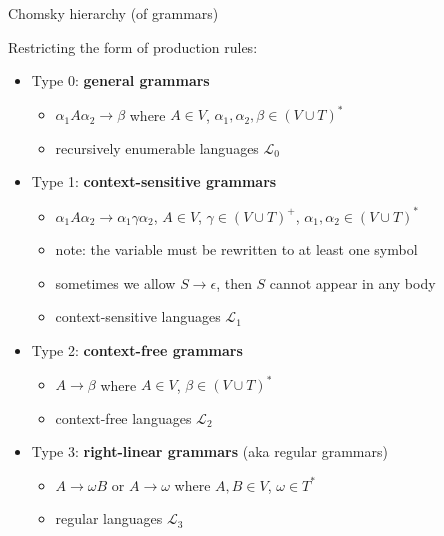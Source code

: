 \documentclass[handout]{beamer}
\begin{document}
\begin{frame}{Chomsky hierarchy (of grammars)}

	Restricting the form of production rules:

	\begin{itemize}
		\item Type 0: \textbf{general grammars}
		\begin{itemize}
			\item \alert{$\alpha_1 A \alpha_2\to\beta$} where $A\in V$, $\alpha_1,\alpha_2,\beta\in (V\cup T)^*$
			\item recursively enumerable languages ${\mathcal L}_0$
		\end{itemize}

		\medskip
		
		\item Type 1: \textbf{context-sensitive grammars}
		\begin{itemize}
			\item \alert{$\alpha_1 A \alpha_2\rightarrow \alpha_1\gamma\alpha_2$}, $A\in V$, $\gamma\in(V\cup T)^+$, $\alpha_1,\alpha_2\in (V\cup T)^*$
			\item note: the variable must be rewritten to at least one symbol
			\item sometimes we allow $S\to\epsilon$, then $S$ cannot appear in any body
			\item context-sensitive languages ${\mathcal L}_1$
		\end{itemize}
		
		\medskip

		\item Type 2: \textbf{context-free grammars}
		\begin{itemize}
			\item \alert{$A\to\beta$} where $A\in V$, $\beta\in (V\cup T)^*$
			\item context-free languages ${\mathcal L}_2$
		\end{itemize}

		\medskip

		\item Type 3: \textbf{right-linear grammars} (aka regular grammars)
		\begin{itemize}
			\item \alert{$A\to\omega B$} or \alert{$A\to\omega$} where $A,B\in V$, $\omega\in T^*$
			\item regular languages ${\mathcal L}_3$
		\end{itemize}
	
	\end{itemize}

\end{frame}
\end{document}
